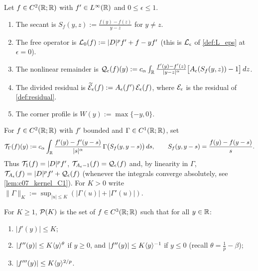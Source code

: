 \begin{definition}
  \label{def:c07_divided_residual}
  Let $f\in C^2(\mathbb{R};\mathbb{R})$ with $f'\in L^\infty(\mathbb{R})$ and $0\le\epsilon\le1$.
  \begin{enumerate}
    \item The secant is $S_f(y,z):=\frac{f(y)-f(z)}{y-z}$ for $y\neq z$.
    \item The free operator is $\mathcal{L}_0(f):=|D|^pf'+f-yf'$ (this is $\mathcal{L}_\epsilon$ of \cref{def:L_eps} at $\epsilon=0$).
    \item The nonlinear remainder is
      $\mathcal{Q}_\epsilon(f)(y):=c_\alpha\int_{\mathbb{R}}\frac{f'(y)-f'(z)}{|y-z|^\alpha}\bigl[A_\epsilon(S_f(y,z))-1\bigr]\,dz$.
    \item The divided residual is $\widetilde{\mathcal{E}}_\epsilon(f):=A_\epsilon(f')\,\mathcal{E}_\epsilon(f)$, where
      $\mathcal{E}_\epsilon$ is the residual of \cref{def:residual}.
    \item The corner profile is $W(y):=\max\{-y,0\}$.
  \end{enumerate}
\end{definition}

\begin{definition}
  \label{def:c07_kernel_operator}
  For $f\in C^2(\mathbb{R};\mathbb{R})$ with $f'$ bounded and $\Gamma\in C^1(\mathbb{R};\mathbb{R})$, set
  \[
    \mathcal{T}_\Gamma(f)(y):=c_\alpha\int_{\mathbb{R}}\frac{f'(y)-f'(y-s)}{|s|^\alpha}\,\Gamma\bigl(S_f(y,y-s)\bigr)\,ds,
    \qquad S_f(y,y-s)=\frac{f(y)-f(y-s)}{s}.
  \]
  Thus $\mathcal{T}_1(f)=|D|^pf'$, $\mathcal{T}_{A_\epsilon-1}(f)=\mathcal{Q}_\epsilon(f)$ and, by linearity in
  $\Gamma$, $\mathcal{T}_{A_\epsilon}(f)=|D|^pf'+\mathcal{Q}_\epsilon(f)$ (whenever the integrals converge
  absolutely, see \cref{lem:c07_kernel_C1}). For $K>0$ write
  $\|\Gamma\|_{K}:=\sup_{|u|\le K}(|\Gamma(u)|+|\Gamma'(u)|)$.
\end{definition}

\begin{definition}
  \label{def:c07_profile_class}
  For $K\geq1$, $\mathcal{P}(K)$ is the set of $f\in C^3(\mathbb{R};\mathbb{R})$ such that for all $y\in\mathbb{R}$:
  \begin{enumerate}
    \item $|f'(y)|\le K$;
    \item $|f''(y)|\le K\langle y \rangle^{\theta}$ if $y\geq0$, and $|f''(y)|\le K\langle y \rangle^{-1}$ if $y\le 0$
      (recall $\theta=\tfrac1p-\beta$);
    \item $|f'''(y)|\le K\langle y \rangle^{2/p}$.
  \end{enumerate}
\end{definition}

